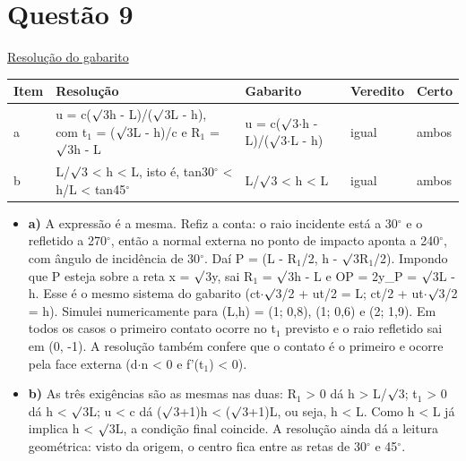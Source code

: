 \documentclass{article}%
\begin{document}
\section*{Questão 9}%
\href{https://poliedroresolve.sistemapoliedro.com.br/vestibulares/ime/2027/ime-2-fase-dia-2-27-10-2026-2-fase-dia-2/dissertativa-9-fisica-2-fase-dia-2-ime-2027}{Resolução do gabarito}\par\smallskip%
\begin{longtable}{@{}p{} p{} p{} p{} p{}@{}}\toprule Item & Resolução & Gabarito & Veredito & Certo \\ \midrule
a & u = c($\surd$3h - L)/($\surd$3L - h), com t$_{1}$ = ($\surd$3L - h)/c e R$_{1}$ = $\surd$3h - L & u = c($\surd$3$\cdot$h - L)/($\surd$3$\cdot$L - h) & igual & ambos \\
b & L/$\surd$3 < h < L, isto é, tan30$^\circ$ < h/L < tan45$^\circ$ & L/$\surd$3 < h < L & igual & ambos \\
\bottomrule\end{longtable}%
\begin{itemize}%
\item%
\textbf{a)} A expressão é a mesma. Refiz a conta: o raio incidente está a 30$^\circ$ e o refletido a 270$^\circ$, então a normal externa no ponto de impacto aponta a 240$^\circ$, com ângulo de incidência de 30$^\circ$. Daí P = (L - R$_{1}$/2, h - $\surd$3R$_{1}$/2). Impondo que P esteja sobre a reta x = $\surd$3y, sai R$_{1}$ = $\surd$3h - L e OP = 2y\_P = $\surd$3L - h. Esse é o mesmo sistema do gabarito (ct$\cdot$$\surd$3/2 + ut/2 = L; ct/2 + ut$\cdot$$\surd$3/2 = h). Simulei numericamente para (L,h) = (1; 0,8), (1; 0,6) e (2; 1,9). Em todos os casos o primeiro contato ocorre no t$_{1}$ previsto e o raio refletido sai em (0, -1). A resolução também confere que o contato é o primeiro e ocorre pela face externa (d$\cdot$n < 0 e f'(t$_{1}$) < 0).%
\item%
\textbf{b)} As três exigências são as mesmas nas duas: R$_{1}$ > 0 dá h > L/$\surd$3; t$_{1}$ > 0 dá h < $\surd$3L; u < c dá ($\surd$3+1)h < ($\surd$3+1)L, ou seja, h < L. Como h < L já implica h < $\surd$3L, a condição final coincide. A resolução ainda dá a leitura geométrica: visto da origem, o centro fica entre as retas de 30$^\circ$ e 45$^\circ$.%
\end{itemize}%
\end{document}
